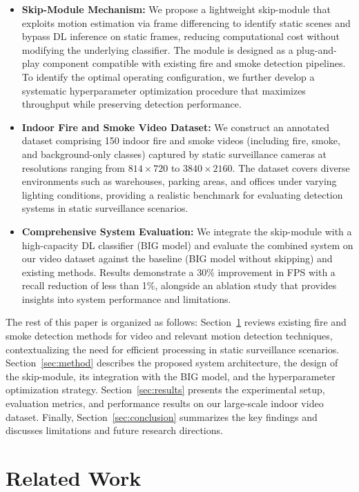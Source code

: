 \documentclass[
  10pt,
]{article}
\begin{document}
\begin{itemize}
\item
  \textbf{Skip-Module Mechanism:} We propose a lightweight skip-module
  that exploits motion estimation via frame differencing to identify
  static scenes and bypass DL inference on static frames, reducing
  computational cost without modifying the underlying classifier. The
  module is designed as a plug-and-play component compatible with
  existing fire and smoke detection pipelines. To identify the optimal
  operating configuration, we further develop a systematic
  hyperparameter optimization procedure that maximizes throughput while
  preserving detection performance.
\item
  \textbf{Indoor Fire and Smoke Video Dataset:} We construct an
  annotated dataset comprising 150 indoor fire and smoke videos
  (including fire, smoke, and background-only classes) captured by
  static surveillance cameras at resolutions ranging from
  \(814 \times 720\) to \(3840 \times 2160\). The dataset covers diverse
  environments such as warehouses, parking areas, and offices under
  varying lighting conditions, providing a realistic benchmark for
  evaluating detection systems in static surveillance scenarios.
\item
  \textbf{Comprehensive System Evaluation:} We integrate the skip-module
  with a high-capacity DL classifier (BIG model) and evaluate the
  combined system on our video dataset against the baseline (BIG model
  without skipping) and existing methods. Results demonstrate a 30\%
  improvement in FPS with a recall reduction of less than 1\%, alongside
  an ablation study that provides insights into system performance and
  limitations.
\end{itemize}

The rest of this paper is organized as follows:
Section~\ref{sec:relatedWork} reviews existing fire and smoke detection
methods for video and relevant motion detection techniques,
contextualizing the need for efficient processing in static surveillance
scenarios. Section~\ref{sec:method} describes the proposed system
architecture, the design of the skip-module, its integration with the
BIG model, and the hyperparameter optimization strategy.
Section~\ref{sec:results} presents the experimental setup, evaluation
metrics, and performance results on our large-scale indoor video
dataset. Finally, Section~\ref{sec:conclusion} summarizes the key
findings and discusses limitations and future research directions.

\section{Related Work}\label{sec:relatedWork}
\end{document}
